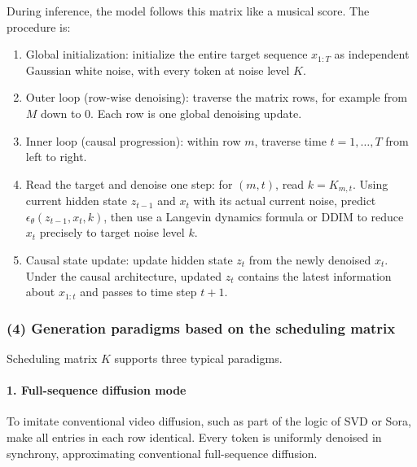 During inference, the model follows this matrix like a musical score. The procedure is:

\begin{enumerate}
\def\labelenumi{\arabic{enumi}.}
\tightlist
\item
  Global initialization: initialize the entire target sequence \(x_{1:T}\) as independent Gaussian white noise, with every token at noise level \(K\).
\item
  Outer loop (row-wise denoising): traverse the matrix rows, for example from \(M\) down to \(0\). Each row is one global denoising update.
\item
  Inner loop (causal progression): within row \(m\), traverse time \(t=1,\ldots,T\) from left to right.
\item
  Read the target and denoise one step: for \((m,t)\), read \(k=K_{m,t}\). Using current hidden state \(z_{t-1}\) and \(x_t\) with its actual current noise, predict \(\epsilon_\theta(z_{t-1},x_t,k)\), then use a Langevin dynamics formula or DDIM to reduce \(x_t\) precisely to target noise level \(k\).
\item
  Causal state update: update hidden state \(z_t\) from the newly denoised \(x_t\). Under the causal architecture, updated \(z_t\) contains the latest information about \(x_{1:t}\) and passes to time step \(t+1\).
\end{enumerate}

\hypertarget{generation-paradigms-based-on-the-scheduling-matrix}{%
\subsubsection{(4) Generation paradigms based on the scheduling matrix}\label{generation-paradigms-based-on-the-scheduling-matrix}}

Scheduling matrix \(K\) supports three typical paradigms.

\hypertarget{full-sequence-diffusion-mode}{%
\paragraph{1. Full-sequence diffusion mode}\label{full-sequence-diffusion-mode}}

To imitate conventional video diffusion, such as part of the logic of SVD or Sora, make all entries in each row identical. Every token is uniformly denoised in synchrony, approximating conventional full-sequence diffusion.

